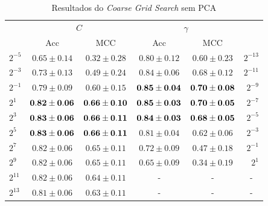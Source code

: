 \begin{table}[ht]
\centering
\begin{tabular}{@{}lcc|ccr@{}}
\toprule
\multirow{2}{*}{} & \multicolumn{2}{c|}{$C$}                   & \multicolumn{2}{c}{$\gamma$} & \multicolumn{1}{l}{\multirow{2}{*}{}} \\ \cmidrule(lr){2-5}
                  & Acc       & MCC                        & Acc       & MCC           & \multicolumn{1}{l}{}                  \\ \midrule
$2^{-5}$          & $0.65 \pm 0.14$ & $0.32 \pm 0.28$              & $0.80 \pm 0.12$ & $0.60 \pm 0.23$ & $2^{-13}$                             \\
$2^{-3}$          & $0.73 \pm 0.13$ & $0.49 \pm 0.24$              & $0.84 \pm 0.06$ & $0.68 \pm 0.12$ & $2^{-11}$                             \\
$2^{-1}$          & $0.79 \pm 0.09$ & $0.60 \pm 0.15$              & $\bf{0.85 \pm 0.04}$ & $\bf{0.70 \pm 0.08}$ & $2^{-9}$                              \\
$2^{1}$           & $\bf{0.82 \pm 0.06}$ & $\bf{0.66 \pm 0.10}$              & $\bf{0.85 \pm 0.03}$ & $\bf{0.70 \pm 0.05}$ & $2^{-7}$                              \\
$2^{3}$           & $\bf{0.83 \pm 0.06}$ & $\bf{0.66 \pm 0.11}$              & $\bf{0.84 \pm 0.03}$ & $\bf{0.68 \pm 0.05}$ & $2^{-5}$                              \\
$2^{5}$           & $\bf{0.83 \pm 0.06}$  & $\bf{0.66 \pm 0.11}$              & $0.81 \pm 0.04$ & $0.62 \pm 0.06$ & $2^{-3}$                              \\
$2^{7}$           & $0.82 \pm 0.06$ & $0.65 \pm 0.11$              & $0.72 \pm 0.09$ & $0.47 \pm 0.18$ & $2^{-1}$                              \\
$2^{9}$           & $0.82 \pm 0.06$ & $0.65 \pm 0.11$              & $0.65 \pm 0.09$ & $0.34 \pm 0.19$ & $2^{1}$                              \\
$2^{11}$          & $0.82 \pm 0.06$ & $0.64 \pm 0.11$              &       -        &        -       & \multicolumn{1}{c}{-}                 \\
$2^{13}$          & $0.81 \pm 0.06$ & $0.63 \pm 0.11$ &  -             &       -        & \multicolumn{1}{c}{-}                 \\ \bottomrule
\end{tabular}
\caption{Resultados do \emph{Coarse Grid Search} sem PCA}
\label{tab:svm_coarse_grid_table}
\end{table}

